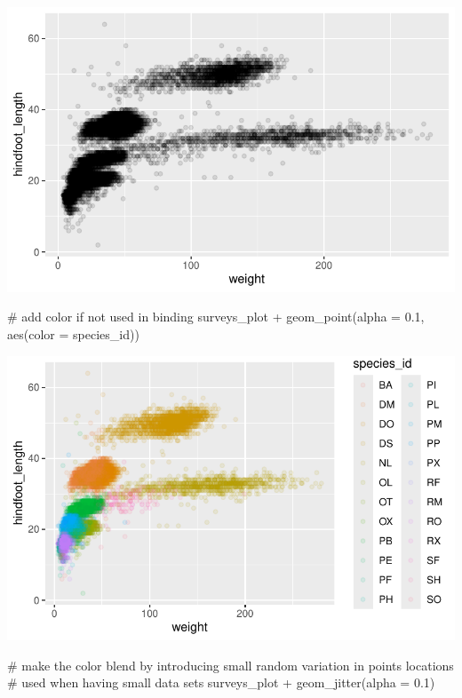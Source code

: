 \documentclass[
  letterpaper,
  DIV=11,
  numbers=noendperiod]{scrreprt}
\newenvironment{Shaded}{\begin{snugshade}}{\end{snugshade}}
\newcommand{\AttributeTok}[1]{\textcolor[rgb]{0.40,0.45,0.13}{#1}}
\newcommand{\CommentTok}[1]{\textcolor[rgb]{0.37,0.37,0.37}{#1}}
\newcommand{\FloatTok}[1]{\textcolor[rgb]{0.68,0.00,0.00}{#1}}
\newcommand{\FunctionTok}[1]{\textcolor[rgb]{0.28,0.35,0.67}{#1}}
\newcommand{\NormalTok}[1]{\textcolor[rgb]{0.00,0.23,0.31}{#1}}
\newcommand{\SpecialCharTok}[1]{\textcolor[rgb]{0.37,0.37,0.37}{#1}}
\begin{document}
\includegraphics{src/notebooks/r_files/figure-pdf/unnamed-chunk-46-3.pdf}

\begin{Shaded}
\begin{Highlighting}[]
\CommentTok{\# add color if not used in binding}
\NormalTok{surveys\_plot }\SpecialCharTok{+} \FunctionTok{geom\_point}\NormalTok{(}\AttributeTok{alpha =} \FloatTok{0.1}\NormalTok{, }\FunctionTok{aes}\NormalTok{(}\AttributeTok{color =}\NormalTok{ species\_id))}
\end{Highlighting}
\end{Shaded}

\includegraphics{src/notebooks/r_files/figure-pdf/unnamed-chunk-46-4.pdf}

\begin{Shaded}
\begin{Highlighting}[]
\CommentTok{\# make the color blend by introducing small random variation in points locations}
\CommentTok{\# used when having small data sets}
\NormalTok{surveys\_plot }\SpecialCharTok{+} \FunctionTok{geom\_jitter}\NormalTok{(}\AttributeTok{alpha =} \FloatTok{0.1}\NormalTok{)}
\end{Highlighting}
\end{Shaded}
\end{document}

